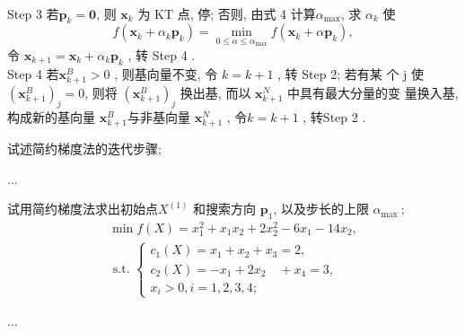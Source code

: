 \documentclass[cn]{elegantbook}
\begin{document}
\begin{algorithm}
\\
Step 3 若$  \boldsymbol{p}_{k}=\mathbf{0} $, 则 $ \boldsymbol{x}_{k}$  为 KT 点, 停; 否则, 由式 4 计算$  \alpha_{\max } $, 求  $\alpha_{k}$  使
$$
f\left(\boldsymbol{x}_{k}+\alpha_{k} \boldsymbol{p}_{k}\right)=\min _{0 \leqslant \alpha \leqslant \alpha_{\max }} f\left(\boldsymbol{x}_{k}+\alpha \boldsymbol{p}_{k}\right),
$$
令  $\boldsymbol{x}_{k+1}=\boldsymbol{x}_{k}+\alpha_{k} \boldsymbol{p}_{k}$ , 转 Step 4 .\\
Step 4 若$  \boldsymbol{x}_{k+1}^{B}>0$ , 则基向量不变, 令 $ k=k+1$ , 转 Step 2; 若有某 个  j  使  $\left(\boldsymbol{x}_{k+1}^{B}\right)_{j}=0 $, 则将  $\left(\boldsymbol{x}_{k+1}^{B}\right)_{j}$  换出基, 而以 $ \boldsymbol{x}_{k+1}^{N} $ 中具有最大分量的变 量换入基, 构成新的基向量  $\boldsymbol{x}_{k+1}^{B}  $与非基向量 $ \boldsymbol{x}_{k+1}^{N}$ , 令$  k=k+1$ , 转Step 2 .
\end{algorithm}

\begin{exercisez}
试述简约梯度法的迭代步骤;
\end{exercisez}
\begin{solution}
...
\end{solution}
\begin{exercisez}
试用简约梯度法求出初始点$  X^{(1)} $ 和搜索方向 $ \boldsymbol{p}_{1} $, 以及步长的上限 $ \alpha_{\text {max }} ;$
$$
\begin{array}{l}
\min f(X)=x_{1}^{2}+x_{1} x_{2}+2 x_{2}^{2}-6 x_{1}-14 x_2, \\
\text { s.t. }\left\{\begin{array}{l}
c_{1}(X)=x_{1}+x_{2}+x_{3}=2, \\ c_{2}(X)=-x_{1}+2 x_{2} \quad+x_{4}=3, \\
x_{i}>0, i=1,2,3,4 ;
\end{array}\right.
\end{array}
$$
\end{exercisez}
\begin{solution}
...
\end{solution}
\end{document}
